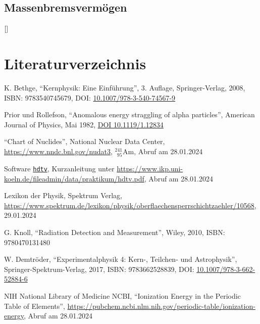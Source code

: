\documentclass[12pt,a4paper]{scrartcl}
\numberwithin{equation}{section} %
\begin{document}
\hypertarget{massenbremsvermuxf6gen}{%
\subsection{Massenbremsvermögen}\label{massenbremsvermuxf6gen}}

$\ref{}$

\clearpage
\hypertarget{literatur}{%
\section{Literaturverzeichnis}\label{literatur}}
\renewcommand{\section}[2]{}

\begin{thebibliography}{99}
	K. Bethge, ``Kernphysik: Eine Einführung'', 3. Auflage,
	Springer-Verlag, 2008, ISBN: 9783540745679, DOI:
	\href{https://doi.org/10.1007/978-3-540-74567-9}{10.1007/978-3-540-74567-9}

	Prior und Rollefson, ``Anomalous energy straggling of alpha
	particles'', American Journal of Physics, Mai 1982,
	\href{https://doi.org/10.1119/1.12834}{DOI 10.1119/1.12834}

	``Chart of Nuclides'', National Nuclear Data Center,
	\url{https://www.nndc.bnl.gov/nudat3}, $^{241}_{\ \ 95}\mathrm{Am}$,
	Abruf am 28.01.2024

	Software \href{https://pypi.org/project/hdtv}{\texttt{hdtv}},
	Kurzanleitung unter
	\url{https://www.ikp.uni-koeln.de/fileadmin/data/praktikum/hdtv.pdf},
	Abruf am 28.01.2024

	Lexikon der Physik, Spektrum Verlag,
	\url{https://www.spektrum.de/lexikon/physik/oberflaechensperrschichtzaehler/10568},
	29.01.2024

	G. Knoll, ``Radiation Detection and Measurement'', Wiley, 2010, ISBN:
	9780470131480

	W. Demtröder, ``Experimentalphysik 4: Kern-, Teilchen- und
	Astrophysik'', Springer-Spektrum-Verlag, 2017, ISBN: 9783662528839,
	DOI:
	\href{https://doi.org/10.1007/978-3-662-52884-6}{10.1007/978-3-662-52884-6}

	NIH National Library of Medicine NCBI, ``Ionization Energy in the
	Periodic Table of Elements'',
	\url{https://pubchem.ncbi.nlm.nih.gov/periodic-table/ionization-energy},
	Abruf am 28.01.2024
	

\end{thebibliography}
\end{document}
